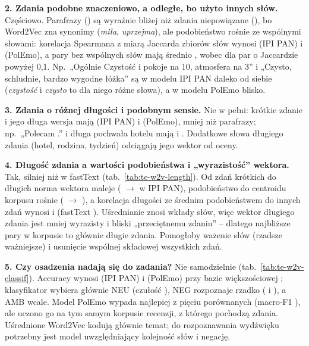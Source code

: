 \textbf{2. Zdania podobne znaczeniowo, a odległe, bo użyto innych słów.} Częściowo. Parafrazy (\teWParaIpi) są
wyraźnie bliżej niż zdania niepowiązane (\teWUnrelIpi), bo Word2Vec zna synonimy (\emph{miła}, \emph{uprzejma}), ale
podobieństwo rośnie ze wspólnymi słowami: korelacja Spearmana z miarą Jaccarda zbiorów słów wynosi \teWJacIpi{}
(IPI PAN) i \teWJacPol{} (PolEmo), a pary bez wspólnych słów mają średnio \teWNoSharedIpi, wobec \teWSharedIpi{} dla
par o Jaccardzie powyżej 0{,}1. Np.\ „Ogólnie Czystość i pokoje na 10, atmosfera na 3'' i „Czysto, schludnie,
bardzo wygodne łóżka'' są w modelu IPI PAN daleko od siebie (\emph{czystość} i \emph{czysto} to dla niego różne
słowa), a w modelu PolEmo blisko.

\textbf{3. Zdania o różnej długości i podobnym sensie.} Nie w pełni: krótkie zdanie i jego długa wersja mają
\teWLenIpi{} (IPI PAN) i \teWLenPol{} (PolEmo), mniej niż parafrazy; np.\ „Polecam .'' i długa pochwała hotelu mają
\teWPolecamIpi{} i \teWPolecamPol. Dodatkowe słowa długiego zdania (hotel, rodzina, tydzień) odciągają jego wektor
od oceny.

\begin{table}[H]
\centering\small

\caption{Długość zdania a wektor dla uśrednionego Word2Vec: trzy grupy zdań według liczby tokenów (te same co
w analizie fastText i USE), średnia norma surowego wektora, podobieństwo do centroidu korpusu i do pozostałych zdań.}
\label{tab:te-w2v-length}
\end{table}

\textbf{4. Długość zdania a wartości podobieństwa i „wyrazistość'' wektora.} Tak, silniej niż w fastText
(tab.~\ref{tab:te-w2v-length}). Od zdań krótkich do długich norma wektora maleje (\teWNormShortIpi{} $\to$
\teWNormLongIpi{} w IPI PAN), podobieństwo do centroidu korpusu rośnie (\teWCentShortIpi{} $\to$ \teWCentLongIpi),
a korelacja długości ze średnim podobieństwem do innych zdań wynosi \teWSpearmanIpi{} i \teWSpearmanPol{}
(fastText \teWSpearmanFt). Uśrednianie znosi wkłady słów, więc wektor długiego zdania jest mniej wyrazisty i bliski
„przeciętnemu zdaniu'' -- dlatego najbliższe pary w korpusie to głównie długie zdania. Pomogłoby ważenie słów
(rzadsze ważniejsze) i usunięcie wspólnej składowej wszystkich zdań.

\begin{table}[H]
\centering\small
\resizebox{\textwidth}{!}{}
\caption{Klasyfikacja wydźwięku zdania na samych osadzeniach (etykiety uzgodnione; ten sam protokół co
w tab.~\ref{tab:classif}, baza większościowa \teWBase).}
\label{tab:te-w2v-classif}
\end{table}

\textbf{5. Czy osadzenia nadają się do zadania?} Nie samodzielnie (tab.~\ref{tab:te-w2v-classif}). Accuracy wynosi
\teWAccIpi{} (IPI PAN) i \teWAccPol{} (PolEmo) przy bazie większościowej \teWBase; klasyfikator wybiera głównie NEU
(czułość \teWRecNeuIpi), NEG rozpoznaje rzadko (\teWRecNegIpi{} i \teWRecNegPol), a AMB wcale. Model PolEmo wypada
najlepiej z pięciu porównanych (macro-F1 \teWFonePol), ale uczono go na tym samym korpusie recenzji, z którego
pochodzą zdania. Uśrednione Word2Vec kodują głównie temat; do rozpoznawania wydźwięku potrzebny jest model
uwzględniający kolejność słów i negację.
